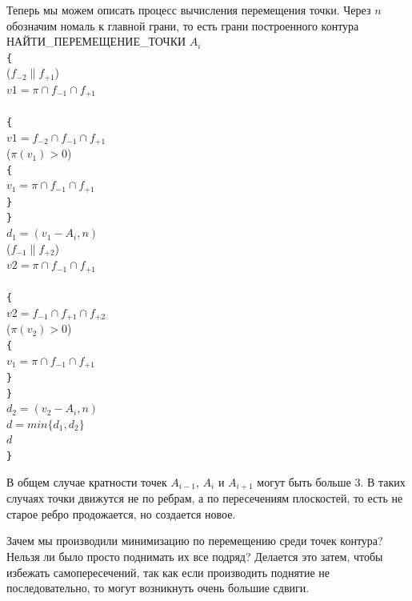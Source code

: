 \documentclass[a4paper,12pt, titlepage]{article}
\begin{document}
\begin{flushleft}
 Теперь мы можем описать процесс вычисления перемещения точки. Через $n$ обозначим номаль к главной грани,
то есть грани построенного контура\\
НАЙТИ\_ПЕРЕМЕЩЕНИЕ\_ТОЧКИ $A_{i}$\\
\verb"{"\\
 ($f_{-2} \parallel f_{+1}$)\\
\quad\quad$v1 = \pi \cap f_{-1} \cap f_{+1}$\\
\\
\quad\verb"{"\\
\quad\quad$v1 = f_{-2} \cap f_{-1} \cap f_{+1}$\\
\quad{} ($\pi(v_{1}) > 0$)\\
\quad\quad\verb"{"\\
\quad\quad\quad$v_{1} = \pi \cap f_{-1} \cap f_{+1}$\\
\quad\quad\verb"}"\\
\quad\verb"}"\\
\quad$d_{1} = (v_{1} - A_{i}, n)$\\

 ($f_{-1} \parallel f_{+2}$)\\
\quad\quad$v2 = \pi \cap f_{-1} \cap f_{+1}$\\
\\
\quad\verb"{"\\
\quad\quad$v2 = f_{-1} \cap f_{+1} \cap f_{+2}$\\
\quad{} ($\pi(v_{2}) > 0$)\\
\quad\quad\verb"{"\\
\quad\quad\quad$v_{1} = \pi \cap f_{-1} \cap f_{+1}$\\
\quad\quad\verb"}"\\
\quad\verb"}"\\
\quad$d_{2} = (v_{2} - A_{i}, n)$\\

\quad$d = min\{d_{1}, d_{2}\}$\\
 $d$\\
\verb"}"\\
\end{flushleft}
\begin{flushleft}
 В общем случае кратности точек $A_{i - 1}$, $A_{i}$ и $A_{i + 1}$ могут быть больше 3. В таких случаях
точки движутся не по ребрам, а по пересечениям плоскостей, то есть не старое ребро продожается, но 
создается новое.
\end{flushleft}
\begin{flushleft}
  Зачем мы производили минимизацию по перемещению среди точек контура? Нельзя ли было просто поднимать их 
все подряд? Делается это затем, чтобы избежать самопересечений, так как если производить поднятие не
последовательно, то могут возникнуть очень большие сдвиги.
\end{flushleft}
\end{document}
